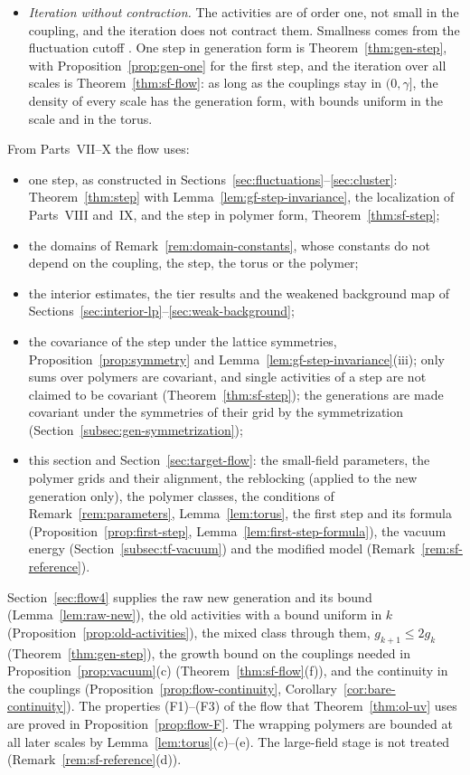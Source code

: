 \begin{remark}
\begin{itemize}
\item \emph{Iteration without contraction.} The activities are of order one, not small in the coupling, and the iteration does not contract them. Smallness comes from the fluctuation cutoff \cite[(2.41)]{BalYM4II}. One step in generation form is Theorem~\ref{thm:gen-step}, with Proposition~\ref{prop:gen-one} for the first step, and the iteration over all scales is Theorem~\ref{thm:sf-flow}: as long as the couplings stay in $(0,\gamma]$, the density of every scale has the generation form, with bounds uniform in the scale and in the torus.
\end{itemize}
From Parts~VII--X the flow uses:
\begin{itemize}
\item one step, as constructed in Sections~\ref{sec:fluctuations}--\ref{sec:cluster}: Theorem~\ref{thm:step} with Lemma~\ref{lem:gf-step-invariance}, the localization of Parts~VIII and~IX, and the step in polymer form, Theorem~\ref{thm:sf-step};
\item the domains of Remark~\ref{rem:domain-constants}, whose constants do not depend on the coupling, the step, the torus or the polymer;
\item the interior estimates, the tier results and the weakened background map of Sections~\ref{sec:interior-lp}--\ref{sec:weak-background};
\item the covariance of the step under the lattice symmetries, Proposition~\ref{prop:symmetry} and Lemma~\ref{lem:gf-step-invariance}(iii); only sums over polymers are covariant, and single activities of a step are not claimed to be covariant (Theorem~\ref{thm:sf-step}); the generations are made covariant under the symmetries of their grid by the symmetrization (Section~\ref{subsec:gen-symmetrization});
\item this section and Section~\ref{sec:target-flow}: the small-field parameters, the polymer grids and their alignment, the reblocking (applied to the new generation only), the polymer classes, the conditions of Remark~\ref{rem:parameters}, Lemma~\ref{lem:torus}, the first step and its formula (Proposition~\ref{prop:first-step}, Lemma~\ref{lem:first-step-formula}), the vacuum energy (Section~\ref{subsec:tf-vacuum}) and the modified model (Remark~\ref{rem:sf-reference}).
\end{itemize}
Section~\ref{sec:flow4} supplies the raw new generation and its bound (Lemma~\ref{lem:raw-new}), the old activities with a bound uniform in $k$ (Proposition~\ref{prop:old-activities}), the mixed class through them, $g_{k+1}\le2g_k$ (Theorem~\ref{thm:gen-step}), the growth bound on the couplings needed in Proposition~\ref{prop:vacuum}(c) (Theorem~\ref{thm:sf-flow}(f)), and the continuity in the couplings (Proposition~\ref{prop:flow-continuity}, Corollary~\ref{cor:bare-continuity}). The properties (F1)--(F3) of the flow that Theorem~\ref{thm:ol-uv} uses are proved in Proposition~\ref{prop:flow-F}. The wrapping polymers are bounded at all later scales by Lemma~\ref{lem:torus}(c)--(e). The large-field stage is not treated (Remark~\ref{rem:sf-reference}(d)).
\end{remark}

